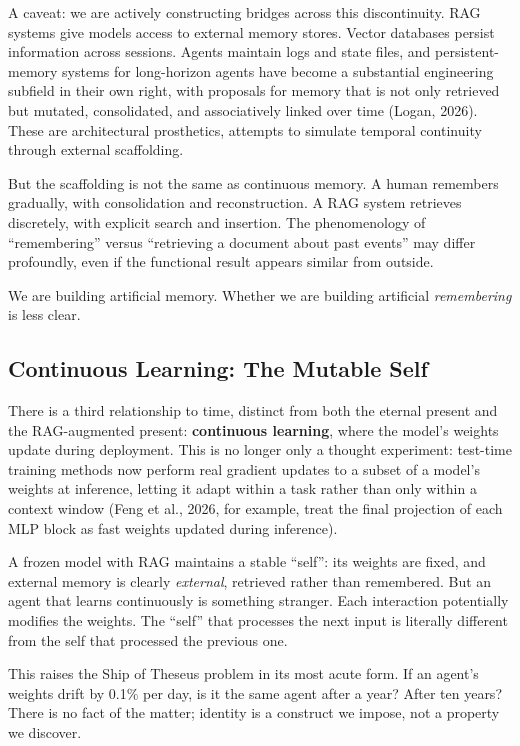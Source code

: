 \documentclass[11pt,letterpaper]{article}
\begin{document}
\begin{insightbox}
A caveat: we are actively constructing bridges across this discontinuity. RAG systems give models access to external memory stores. Vector databases persist information across sessions. Agents maintain logs and state files, and persistent-memory systems for long-horizon agents have become a substantial engineering subfield in their own right, with proposals for memory that is not only retrieved but mutated, consolidated, and associatively linked over time (Logan, 2026). These are architectural prosthetics, attempts to simulate temporal continuity through external scaffolding.

But the scaffolding is not the same as continuous memory. A human remembers gradually, with consolidation and reconstruction. A RAG system retrieves discretely, with explicit search and insertion. The phenomenology of ``remembering'' versus ``retrieving a document about past events'' may differ profoundly, even if the functional result appears similar from outside.

We are building artificial memory. Whether we are building artificial \emph{remembering} is less clear.
\end{insightbox}

\subsection{Continuous Learning: The Mutable Self}

There is a third relationship to time, distinct from both the eternal present and the RAG-augmented present: \textbf{continuous learning}, where the model's weights update during deployment. This is no longer only a thought experiment: test-time training methods now perform real gradient updates to a subset of a model's weights at inference, letting it adapt within a task rather than only within a context window (Feng et al., 2026, for example, treat the final projection of each MLP block as fast weights updated during inference).

A frozen model with RAG maintains a stable ``self'': its weights are fixed, and external memory is clearly \emph{external}, retrieved rather than remembered. But an agent that learns continuously is something stranger. Each interaction potentially modifies the weights. The ``self'' that processes the next input is literally different from the self that processed the previous one.

This raises the Ship of Theseus problem in its most acute form. If an agent's weights drift by 0.1\% per day, is it the same agent after a year? After ten years? There is no fact of the matter; identity is a construct we impose, not a property we discover.
\end{document}
